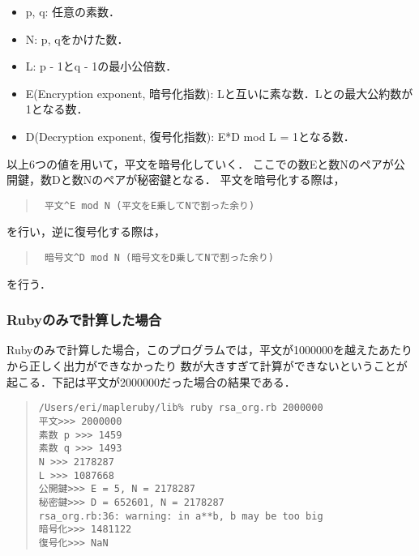 \begin{itemize}
\item p, q: 任意の素数．
\item N: p, qをかけた数．
\item L: p - 1とq - 1の最小公倍数．
\item E(Encryption exponent, 暗号化指数): Lと互いに素な数．Lとの最大公約数が1となる数．
\item D(Decryption exponent, 復号化指数): E*D mod L = 1となる数．
\end{itemize}
以上6つの値を用いて，平文を暗号化していく．
ここでの数Eと数Nのペアが公開鍵，数Dと数Nのペアが秘密鍵となる．
平文を暗号化する際は，
\begin{quote}\begin{verbatim}
 平文^E mod N (平文をE乗してNで割った余り)
\end{verbatim}\end{quote}
を行い，逆に復号化する際は，
\begin{quote}\begin{verbatim}
 暗号文^D mod N (暗号文をD乗してNで割った余り)
\end{verbatim}\end{quote}
を行う．

\subsubsection{Rubyのみで計算した場合}
Rubyのみで計算した場合，このプログラムでは，平文が1000000を越えたあたりから正しく出力ができなかったり
数が大きすぎて計算ができないということが起こる．下記は平文が2000000だった場合の結果である．
\begin{quote}\begin{verbatim}
/Users/eri/mapleruby/lib% ruby rsa_org.rb 2000000
平文>>> 2000000
素数 p >>> 1459
素数 q >>> 1493
N >>> 2178287
L >>> 1087668
公開鍵>>> E = 5, N = 2178287
秘密鍵>>> D = 652601, N = 2178287
rsa_org.rb:36: warning: in a**b, b may be too big
暗号化>>> 1481122
復号化>>> NaN
\end{verbatim}\end{quote}
